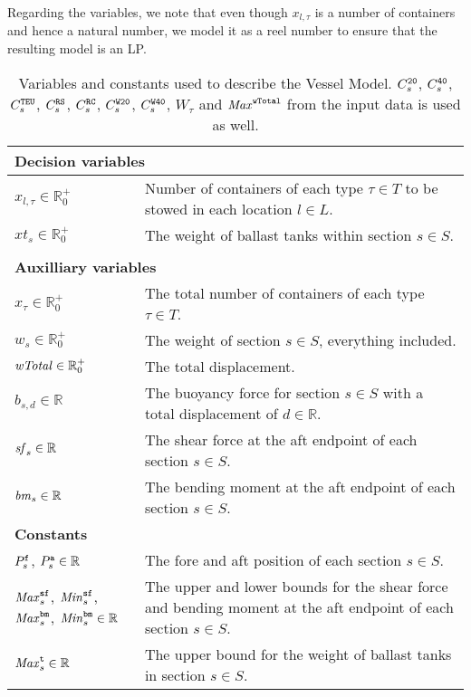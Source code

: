 Regarding the variables, we note that even though $x_{l,\tau}$ is a number of containers and hence a natural number, we model it as a reel number to ensure that the resulting model is an LP.  

\begin{table}
\centering
\begin{tabular}{p{3.5cm}p{9cm}}
\multicolumn{2}{l}{\textbf{Decision variables}}\\
\hline
$x_{l,\tau}\in \mathbb{R}^+_0$
		&Number of containers of each type $\tau\in T$ to be stowed in each location $l\in L$.\\
$xt_s\in \mathbb{R}^+_0$
		& The weight of ballast tanks within section $s\in S$.\\
\\
\multicolumn{2}{l}{\textbf{Auxilliary variables}}\\
\hline
$x_\tau\in \mathbb{R}^+_0$ & The total number of containers of each type $\tau\in T$.\\
$w_s\in \mathbb{R}^+_0$	& The weight of section $s\in S$, everything included.\\
$\mathit{wTotal}\in \mathbb{R}^+_0$	& The total displacement.\\
$b_{s,d} \in\mathbb{R}$ & The buoyancy force for section $s \in S$ with a total displacement of $d\in \mathbb{R}$.\\
$\mathit{sf}_s\in \mathbb{R}$ & The shear force at the aft endpoint of each section $s\in S$.\\
$\mathit{bm}_s\in \mathbb{R}$ & The bending moment at the aft endpoint of each section $s\in S$.\\
%
\multicolumn{2}{l}{\textbf{Constants}}\\
\hline\noalign{\smallskip}
$P^{\texttt{f}}_s$, $P^{\texttt{a}}_s \in \mathbb{R}$ & The fore and aft position of each section $s \in S$.\\  
$\mathit{Max}^{\texttt{sf}}_s$, $\mathit{Min}^{\texttt{sf}}_s$, $\mathit{Max}^{\texttt{bm}}_s$, $\mathit{Min}^{\texttt{bm}}_s \in \mathbb{R}$ & The upper and lower bounds for the shear force and bending moment at the aft endpoint of each section $s\in S$.\\
$\mathit{Max}^{\texttt{t}}_s\in \mathbb{R}$ & The upper bound for the weight of ballast tanks in section $s\in S$.\\
\end{tabular}
\caption{Variables and constants used to describe the Vessel Model. $C_s^{\texttt{20}}$, $C_s^{\texttt{40}}$, $C_s^{\texttt{TEU}}$, $C_s^{\texttt{RS}}$, $C_s^{\texttt{RC}}$, $C_s^{\texttt{W20}}$, $C_s^{\texttt{W40}}$, $W_\tau$ and $\mathit{Max}^{\texttt{wTotal}}$ from the input data is used as well.}\label{table:constants}
\end{table}
%

